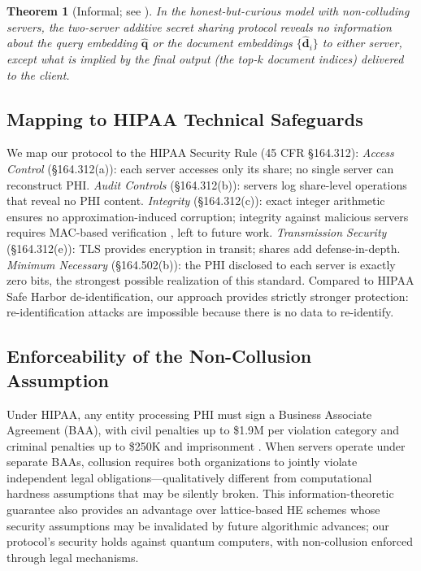 \documentclass[conference]{IEEEtran}
\newcommand{\query}{\mathbf{q}}
\newcommand{\doc}{\mathbf{d}}
\newtheorem{theorem}{Theorem}
\begin{document}
\begin{theorem}[Informal; see \cite{syed2026rpb}]
In the honest-but-curious model with non-colluding servers, the two-server
additive secret sharing protocol reveals no information about the query
embedding $\hat{\query}$ or the document embeddings $\{\hat{\doc}_i\}$ to
either server, except what is implied by the final output (the top-$k$
document indices) delivered to the client.
\end{theorem}


\subsection{Mapping to HIPAA Technical Safeguards}
\label{sec:hipaa_mapping}

We map our protocol to the HIPAA Security Rule (45 CFR \S 164.312):
\emph{Access Control} (\S 164.312(a)): each server accesses only its share;
no single server can reconstruct PHI.
\emph{Audit Controls} (\S 164.312(b)): servers log share-level operations
that reveal no PHI content.
\emph{Integrity} (\S 164.312(c)): exact integer arithmetic ensures no
approximation-induced corruption; integrity against malicious servers
requires MAC-based verification \cite{damgard2012spdz}, left to future work.
\emph{Transmission Security} (\S 164.312(e)): TLS provides encryption in
transit; shares add defense-in-depth.
\emph{Minimum Necessary} (\S 164.502(b)): the PHI disclosed to each server
is exactly zero bits, the strongest possible realization of this standard.
Compared to HIPAA Safe Harbor de-identification, our approach provides
strictly stronger protection: re-identification attacks
\cite{elemam2011reidentification} are impossible because there is no
data to re-identify.


\subsection{Enforceability of the Non-Collusion Assumption}
\label{sec:non_collusion}

Under HIPAA, any entity processing PHI must sign a Business Associate
Agreement (BAA), with civil penalties up to \$1.9M per violation category
and criminal penalties up to \$250K and imprisonment \cite{hipaa1996}.
When servers operate under separate BAAs, collusion requires both
organizations to jointly violate independent legal obligations---qualitatively
different from computational hardness assumptions that may be silently
broken. This information-theoretic guarantee also provides an advantage over
lattice-based HE schemes whose security assumptions may be invalidated by
future algorithmic advances; our protocol's security holds against
quantum computers, with non-collusion enforced through legal mechanisms.
\end{document}
